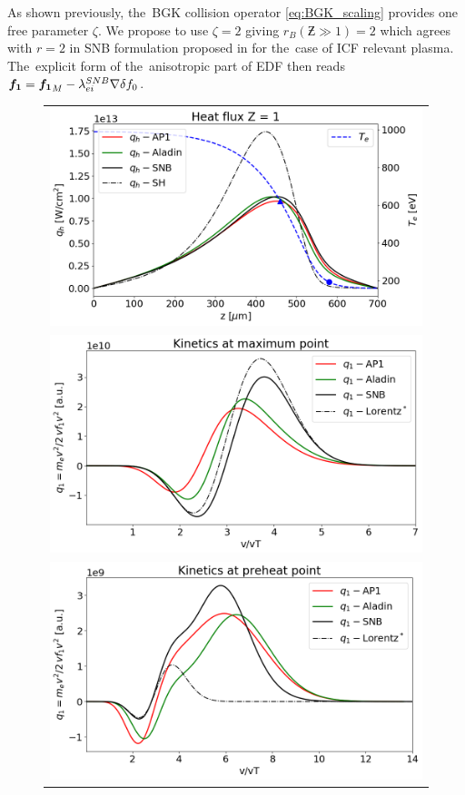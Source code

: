 As shown previously, the~BGK collision operator \eqref{eq:BGK_scaling}
provides one free parameter $\zeta$.
We propose to use $\zeta = 2$ giving $r_B(\Zbar\gg1) = 2$ which agrees 
with $r=2$ in SNB formulation proposed in \cite{Brodrick_PoP2017} 
for the~case of ICF relevant plasma. The~explicit form of the~anisotropic 
part of EDF then reads ${\boldsymbol{f_1}} = {\boldsymbol{f_1}}_M - \lambda_{ei}^{SNB}\nabla\delta f_0$.

\begin{figure}[htb]
  \begin{center}
    \begin{tabular}{c}
      \includegraphics[width=\figscale\textwidth]{../VFPdata/C7_Aladin_case5_heatflux.png} \\
      \includegraphics[width=\figscale\textwidth]{../VFPdata/C7_Aladin_case5_kinetics.png} \\
	  \includegraphics[width=\figscale\textwidth]{../VFPdata/C7_Aladin_case5_nonlocal_kinetics.png} 

\end{tabular}
\end{center}
\end{figure}
